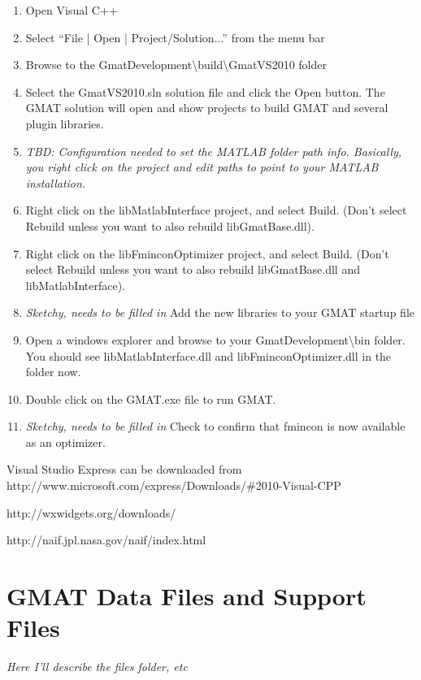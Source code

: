 \documentclass[letterpaper,10pt]{article}%
\begin{document}
\begin{enumerate}
\item Open Visual C++
\item Select ``File | Open | Project/Solution...'' from the menu bar
\item Browse to the GmatDevelopment\textbackslash build\textbackslash GmatVS2010 folder
\item Select the GmatVS2010.sln solution file and click the Open button.  The GMAT solution will open and show projects to build GMAT and several plugin libraries.
\item \textit{TBD: Configuration needed to set the MATLAB folder path info.  Basically, you right click on the project and edit paths to point to your MATLAB installation.}
\item Right click on the libMatlabInterface project, and select Build.  (Don't select Rebuild unless you want to also rebuild libGmatBase.dll).
\item Right click on the libFminconOptimizer project, and select Build.  (Don't select Rebuild unless you want to also rebuild libGmatBase.dll and libMatlabInterface).
\item \textit{Sketchy, needs to be filled in} Add the new libraries to your GMAT startup file
\item Open a windows explorer and browse to your GmatDevelopment\textbackslash bin folder.  You should see libMatlabInterface.dll and libFminconOptimizer.dll in the folder now.
\item Double click on the GMAT.exe file to run GMAT.
\item \textit{Sketchy, needs to be filled in} Check to confirm that fmincon is now available as an optimizer.
\end{enumerate}



\begin{thebibliography}{9}                                                                                               
 Visual Studio Express can be downloaded from http://www.microsoft.com/express/Downloads/\#2010-Visual-CPP

 http://wxwidgets.org/downloads/
\end{thebibliography}

 http://naif.jpl.nasa.gov/naif/index.html

\appendix

\section{GMAT Data Files and Support Files }

\textit{Here I'll describe the files folder, etc}
\end{document}
